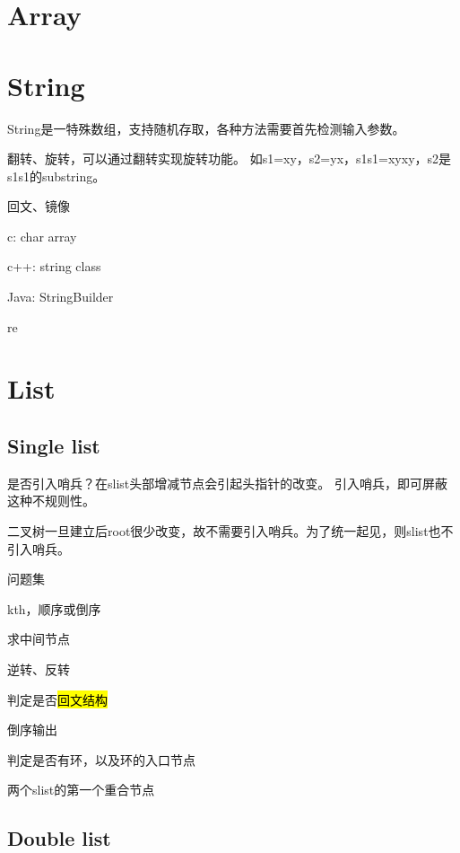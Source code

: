\section{Array}

\section{String}

String是一特殊数组，支持随机存取，各种方法需要首先检测输入参数。

翻转、旋转，可以通过翻转实现旋转功能。
如s1=xy，s2=yx，s1s1=xyxy，s2是s1s1的substring。

回文、镜像

\hrulefill

\begin{enumbox}
\item c: char array
\item c++: string class
\item Java: StringBuilder
\item re
\end{enumbox}

\section{List}

\subsection{Single list}

是否引入哨兵？在slist头部增减节点会引起头指针的改变。
引入哨兵，即可屏蔽这种不规则性。

二叉树一旦建立后root很少改变，故不需要引入哨兵。为了统一起见，则slist也不引入哨兵。

问题集
\begin{enumbox}
\item kth，顺序或倒序
\item 求中间节点
\item 逆转、反转
\item 判定是否\hl{回文结构}
\item 倒序输出
\item 判定是否有环，以及环的入口节点
\item 两个slist的第一个重合节点
\end{enumbox}

\subsection{Double list}

